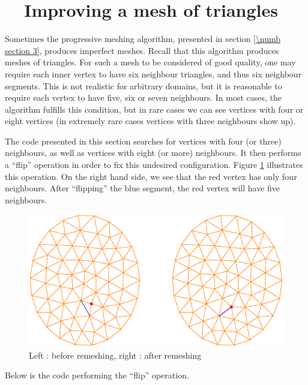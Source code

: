 \section{~~Improving a mesh of triangles}\label{\numb section 10.\numb parag 4}

Sometimes the progressive meshing algorithm, presented in section \ref{\numb section 3},
produces imperfect meshes.
Recall that this algorithm produces meshes of triangles.
For such a mesh to be considered of good quality, one may require each inner vertex
to have six neighbour triangles, and thus six neighbour segments.
This is not realistic for arbitrary domains, but it is reasonable to require each vertex
to have five, six or seven neighbours.
In most cases, the algorithm fulfills this condition, but in rare cases we can see vertices
with four or eight vertices (in extremely rare cases vertices with three neighbours show up).

The code presented in this section searches for vertices with four (or three) neighbours,
as well as vertices with eight (or more) neighbours.
It then performs a ``flip'' operation in order to fix this undesired configuration.
Figure \ref{\numb section 10.\numb fig 2} illustrates this operation.
On the right hand side, we see that the red vertex has only four neighbours.
After ``flipping'' the blue segment, the red vertex will have five neighbours.

\begin{figure}[ht] \centering
  \includegraphics[width=127mm]{two-ellipses}
  \caption{Left : before remeshing, right : after remeshing}
  \label{\numb section 10.\numb fig 2}
\end{figure}

Below is the code performing the ``flip'' operation.

